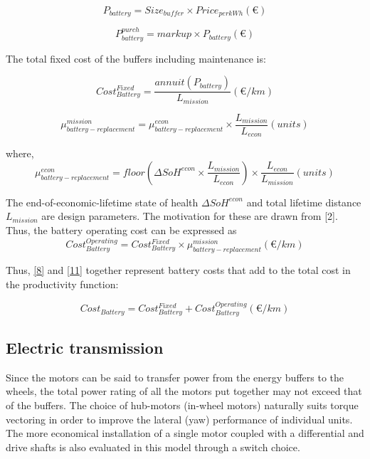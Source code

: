 \documentclass[ExampleMasters.tex]{subfiles}
\begin{document}
			\begin{equation}
				P_{battery}= Size_{buffer} \times Price_{perkWh} (\euro{})
			\end{equation}

			\begin{equation} 
				P^{purch}_{battery} = markup \times P_{battery} (\euro{})
			\end{equation}

			The total fixed cost of the buffers including maintenance is:

			\begin{equation} \label{8}
				Cost_{Battery}^{Fixed} = \frac{annuit(P_{battery})}{L_{mission}} (\euro{}/km)
			\end{equation}

			\begin{equation}
				\mu_{battery-replacement}^{mission} = \mu_{battery-replacement}^{econ} \times \frac{L_ {mission}}{L_{econ}} (units)
			\end{equation}

			where,
			\begin{equation}
				\mu_{battery-replacement}^{econ} = floor(\Delta SoH^{econ}\times \frac{L_ {mission}}{L_{econ}}) \times \frac{L_ {econ}}{L_{mission}} (units)
			\end{equation}

			The end-of-economic-lifetime state of health $\Delta SoH^{econ}$ and total lifetime distance $L_{mission}$ are design parameters. The motivation for these are drawn from [2]. Thus, the battery operating cost can be expressed as
			\begin{equation} \label{11}
				Cost_{Battery}^{Operating} = Cost_{Battery}^{Fixed} \times \mu_{battery-replacement}^{mission} (\euro{}/km)
			\end{equation}

			Thus, \eqref{8} and \eqref{11} together represent battery costs that add to the total cost in the productivity function:

			\begin{equation}
				Cost_{Battery} = Cost_{Battery}^{Fixed} + Cost_{Battery}^{Operating} (\euro{}/km)
			\end{equation}

		\subsection{Electric transmission}

			Since the motors can be said to transfer power from the energy buffers to the wheels, the total power rating of all the motors put together may not exceed that of the buffers. The choice of hub-motors (in-wheel motors) naturally suits torque vectoring in order to improve the lateral (yaw) performance of individual units. The more economical installation of a single motor coupled with a differential and drive shafts is also evaluated in this model through a switch choice. 
\end{document}
